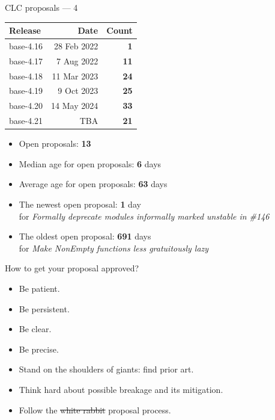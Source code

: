 \documentclass[handout]{beamer}
\begin{document}
\begin{frame}{CLC proposals --- 4}

\def\tt{}

\begin{table}[c]
\begin{tabular}{lrr}
Release & Date & Count\\ \hline
base-4.16 & 28 Feb 2022 & {\bf 1} \\
base-4.17 &  7 Aug 2022 & {\bf 11} \\
base-4.18 & 11 Mar 2023 & {\bf 24} \\
base-4.19 &  9 Oct 2023 & {\bf 25} \\
base-4.20 & 14 May 2024 & {\bf 33} \\
base-4.21 & TBA & {\bf 21} \\
\end{tabular}
\end{table}

\medskip\pause

\begin{itemize}[<+->]
\item Open proposals: {\bf 13}
\item Median  age for open proposals: {\bf 6} days
\item Average age for open proposals: {\bf 63} days
\item The newest open proposal:
   {\bf 1} day \\ {\small for {\it Formally deprecate modules informally marked unstable in \#146}}
\item The oldest open proposal:
  {\bf 691} days \\ {\small for {\it Make NonEmpty functions less gratuitously lazy}}



\end{itemize}
\end{frame}

\begin{frame}{How to get your proposal approved?}
\begin{itemize}[<+->]

\item Be patient.
\item Be persistent.
\item Be clear.
\item Be precise.
\item Stand on the shoulders of giants: find prior art.
\item Think hard about possible breakage and its mitigation.
\item Follow the \st{white rabbit} proposal process.

\end{itemize}
\end{frame}
\end{document}
